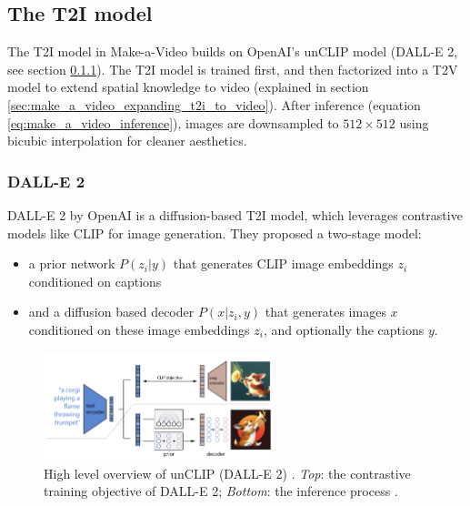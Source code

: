 \subsection{The T2I model}


The T2I model in Make-a-Video builds on OpenAI's unCLIP model (DALL-E 2, see section \ref{sec:dalle_2}). The T2I model is trained first, and then factorized into a T2V model to extend spatial knowledge to video (explained in section \ref{sec:make_a_video_expanding_t2i_to_video}). After inference (equation \ref{eq:make_a_video_inference}), images are downsampled to $512\times 512$ using bicubic interpolation for cleaner aesthetics.







\subsubsection{DALL-E 2}
\label{sec:dalle_2}

DALL-E 2 by OpenAI \cite{dalle_2} is a diffusion-based T2I model, which leverages contrastive models like CLIP for image generation. They proposed a two-stage model: 

\begin{itemize}
    \item a prior network $P(z_i | y)$ that generates CLIP image embeddings $z_i$ conditioned on captions
    \item and a diffusion based decoder $P(x | z_i, y)$ that generates images $x$ conditioned on these image embeddings $z_i$, and optionally the captions $y$.
\end{itemize}

\begin{figure}
    \centering
    \includegraphics[width=0.6\textwidth]{images/make_a_video/dalle_2.png}
    \caption{High level overview of unCLIP (DALL-E 2) \cite{dalle_2}. \textit{Top}: the contrastive training objective of DALL-E 2; \textit{Bottom}: the inference process \cite{dalle_2}.}
    \label{fig:make_a_video_dalle2_overview}
\end{figure}

